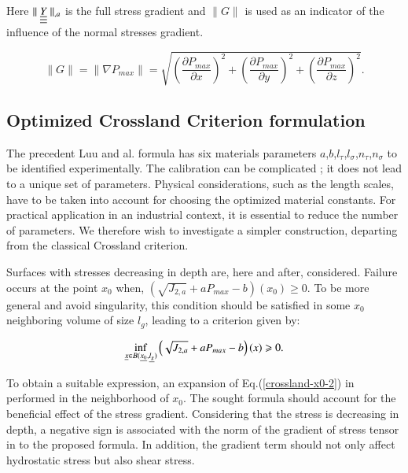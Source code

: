 \documentclass[3p,times,procedia,number]{elsarticle}
\begin{document}
Here $\parallel \uline{\uline{\uline{Y}}}\parallel_{,a}$ is the full stress gradient and $\parallel G\parallel$ is used as an indicator of the influence of the normal stresses gradient.

\begin{equation}
\parallel{G}\parallel=\parallel{\nabla P_{max}}\parallel=\sqrt{\left(\frac{\partial P_{max}}{\partial x}\right)^2+\left(\frac{\partial P_{max}}{\partial y}\right)^2+\left(\frac{\partial P_{max}}{\partial z}\right)^2} .
\end{equation}



\subsection{Optimized Crossland Criterion formulation}
The precedent Luu and al. formula has six materials parameters $a$,$b$,$l_\tau$,$l_\sigma$,$n_\tau$,$n_\sigma$ to be identified experimentally. The calibration can be complicated ; it does not lead to a unique set of parameters. Physical considerations, such as the length scales, have to be taken into account for choosing the optimized material constants. For practical application in an industrial context, it is essential to reduce the number of parameters. We therefore wish to investigate a simpler construction, departing from the classical Crossland criterion.

Surfaces with stresses decreasing in depth are, here and after, considered. Failure occurs at the point $x_0$ when,  $(\sqrt{J_{2,a}}+aP_{max}-b)(x_0)\geqslant 0 $. To be more general and avoid singularity, this condition should be satisfied in some $x_0$ neighboring volume of size $l_g$, leading to a criterion given by:

\begin{equation}
\inf\limits_{\uline{x}\in B(\uline{x_0},\uline{l_g})}\left(\sqrt{J_{2,a}}+aP_{max}-b\right)(x)\geqslant 0 .
\label{crossland-x0-2}
\end{equation}

To obtain a suitable expression, an expansion of Eq.(\ref{crossland-x0-2}) in performed in the neighborhood of ${x_0}$. The sought formula should account for the beneficial effect of the stress gradient. Considering that the stress is decreasing in depth, a negative sign is associated with the norm of the gradient of stress tensor in to the proposed formula. In addition, the gradient term should not only affect hydrostatic stress but also shear stress.
\end{document}

